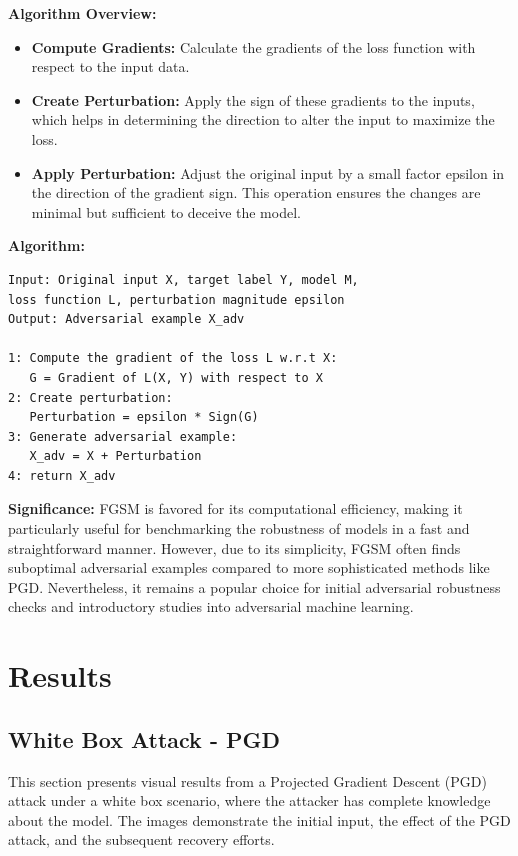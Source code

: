 \documentclass[letterpaper,twocolumn,10pt]{article}
\begin{document}
\textbf{Algorithm Overview:}
\begin{itemize}
    \item \textbf{Compute Gradients:} Calculate the gradients of the loss function with respect to the input data.
    \item \textbf{Create Perturbation:} Apply the sign of these gradients to the inputs, which helps in determining the direction to alter the input to maximize the loss.
    \item \textbf{Apply Perturbation:} Adjust the original input by a small factor epsilon in the direction of the gradient sign. This operation ensures the changes are minimal but sufficient to deceive the model.
\end{itemize}

\textbf{Algorithm:}
\begin{verbatim}
Input: Original input X, target label Y, model M,
loss function L, perturbation magnitude epsilon
Output: Adversarial example X_adv

1: Compute the gradient of the loss L w.r.t X:
   G = Gradient of L(X, Y) with respect to X
2: Create perturbation:
   Perturbation = epsilon * Sign(G)
3: Generate adversarial example:
   X_adv = X + Perturbation
4: return X_adv
\end{verbatim}


\textbf{Significance:}
FGSM is favored for its computational efficiency, making it particularly useful for benchmarking the robustness of models in a fast and straightforward manner. However, due to its simplicity, FGSM often finds suboptimal adversarial examples compared to more sophisticated methods like PGD. Nevertheless, it remains a popular choice for initial adversarial robustness checks and introductory studies into adversarial machine learning.

\section{Results}

\subsection{White Box Attack - PGD}
This section presents visual results from a Projected Gradient Descent (PGD) attack under a white box scenario, where the attacker has complete knowledge about the model. The images demonstrate the initial input, the effect of the PGD attack, and the subsequent recovery efforts.
\end{document}
